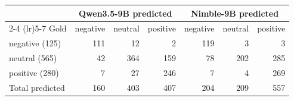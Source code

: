 \begin{tabular}{lrrrrrr}
\toprule
 & \multicolumn{3}{c}{Qwen3.5-9B predicted} & \multicolumn{3}{c}{Nimble-9B predicted} \\
\cmidrule(lr){2-4} \cmidrule(lr){5-7}
Gold & negative & neutral & positive & negative & neutral & positive \\
\midrule
negative (125) & 111 & 12 & 2 & 119 & 3 & 3 \\
neutral (565) & 42 & 364 & 159 & 78 & 202 & 285 \\
positive (280) & 7 & 27 & 246 & 7 & 4 & 269 \\
\midrule
Total predicted & 160 & 403 & 407 & 204 & 209 & 557 \\
\bottomrule
\end{tabular}
